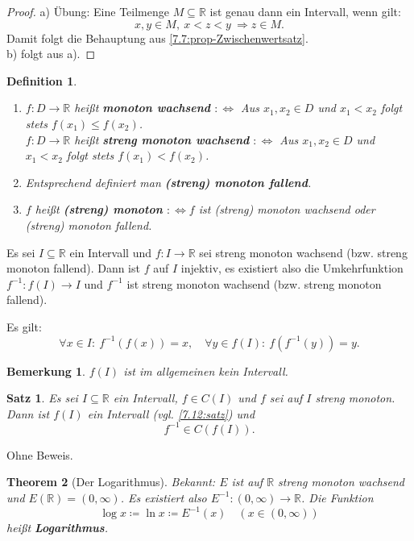 \documentclass[12pt]{extreport} %
\newcommand{\R}{\mathbb{R}}
\theoremstyle{named}
\newtheorem{unnamedtheorem}{Theorem} \counterwithin{unnamedtheorem}{chapter}
\theoremstyle{itshape}
\newtheorem{satz}[unnamedtheorem]{Satz}
\newtheorem*{definition}{Definition}
\theoremstyle{normal}
\newtheorem*{bemerkung}{Bemerkung}
\begin{document}
\begin{proof}
	a) Übung: Eine Teilmenge $M\subseteq \R$ ist genau dann ein Intervall, wenn gilt:
	$$
	x,y \in M, ~ x<z<y ~ \Rightarrow z \in M.
	$$
	Damit folgt die Behauptung aus \ref{7.7:prop-Zwischenwertsatz}.\\
	b) folgt aus a).
\end{proof}

      
\begin{definition} ~\
	\begin{enumerate}
		\item $f \colon D \rightarrow \R$ hei{\ss}t \textbf{monoton wachsend} $:\iff$ Aus $x_{1}, x_{2} \in D$ und $x_{1} < x_{2}$ folgt stets $f(x_{1}) \leq f(x_{2})$. \\
			$f \colon D \rightarrow \R$ hei{\ss}t \textbf{streng monoton wachsend} $:\iff$ Aus $x_{1}, x_{2} \in D$ und $x_{1} < x_{2}$ folgt stets $f(x_{1}) < f(x_{2})$.
		\item Entsprechend definiert man \textbf{(streng) monoton fallend}.
		\item $f$ hei{\ss}t \textbf{(streng) monoton} $:\iff f$ ist (streng) monoton wachsend oder (streng) monoton fallend.
	\end{enumerate}
\end{definition}


Es sei $I \subseteq \R$ ein Intervall und $f \colon I \to \R$ sei streng monoton wachsend (bzw. streng monoton fallend). Dann ist $f$ auf $I$ injektiv, es existiert also die Umkehrfunktion 
$f^{-1} \colon f(I) \to I$ und $f^{-1}$ ist streng monoton wachsend (bzw. streng monoton fallend).

Es gilt: 
$$
\forall x \in I: ~ f^{-1}(f(x)) = x, \quad  \forall y \in f(I): ~ f(f^{-1}(y)) =y.
$$

\begin{bemerkung}
	 $f(I)$ ist im allgemeinen kein Intervall. 
\end{bemerkung}



\begin{satz} \label{7.13:satz}
	Es sei $I \subseteq \R$ ein Intervall, $f \in C(I)$ und $f$ sei auf $I$ streng monoton. Dann ist $f(I)$ ein Intervall (vgl. \ref{7.12:satz}) und
	$$ f^{-1} \in C \left( f(I) \right). $$	
\end{satz}

Ohne Beweis.

\begin{unnamedtheorem}[Der Logarithmus] \label{7.14:prop-Logarithmus}
	Bekannt: $E$ ist auf $\R$ streng monoton wachsend und $E(\R) = (0, \infty)$. Es existiert also $E^{-1} \colon (0, \infty) \rightarrow \R$. Die Funktion
		$$ \log x \coloneqq \ln x \coloneqq E^{-1}(x) \quad (x \in (0, \infty)) $$
	hei{\ss}t \textbf{Logarithmus}.
\end{unnamedtheorem}
\end{document}
